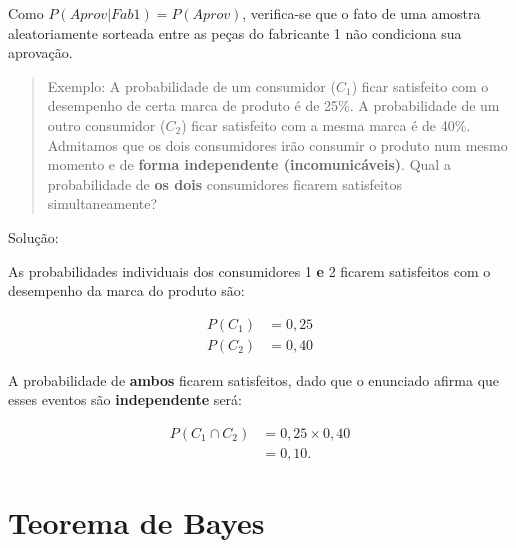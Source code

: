 \documentclass[
]{book}
\begin{document}
\hfill\break

Como \(P(Aprov|Fab1) = P(Aprov)\), verifica-se que o fato de uma amostra aleatoriamente sorteada entre as peças do fabricante 1 não condiciona sua aprovação.

\hfill\break

\begin{quote}
Exemplo: A probabilidade de um consumidor (\(C_{1}\)) ficar satisfeito com o desempenho de certa marca de produto é de 25\%. A probabilidade de um outro consumidor (\(C_{2}\)) ficar satisfeito com a mesma marca é de 40\%. Admitamos que os dois consumidores irão consumir o produto num mesmo momento e de \textbf{forma independente (incomunicáveis)}. Qual a probabilidade de \textbf{os dois} consumidores ficarem satisfeitos simultaneamente?
\end{quote}

\hfill\break

Solução:

\hfill\break

As probabilidades individuais dos consumidores 1 \textbf{e} 2 ficarem satisfeitos com o desempenho da marca do produto são:

\hfill\break

\begin{align*}
P(C_{1}) & = 0,25\\
P(C_{2}) & = 0,40
\end{align*}

\hfill\break

A probabilidade de \textbf{ambos} ficarem satisfeitos, dado que o enunciado afirma que esses eventos são \textbf{independente} será:

\hfill\break

\begin{align*}
P(C_{1} \cap C_{2}) & = 0,25 \times 0,40\\
                    & = 0,10.
\end{align*}

\hfill\break

\hypertarget{teorema-de-bayes}{%
\section{Teorema de Bayes}\label{teorema-de-bayes}}
\end{document}
